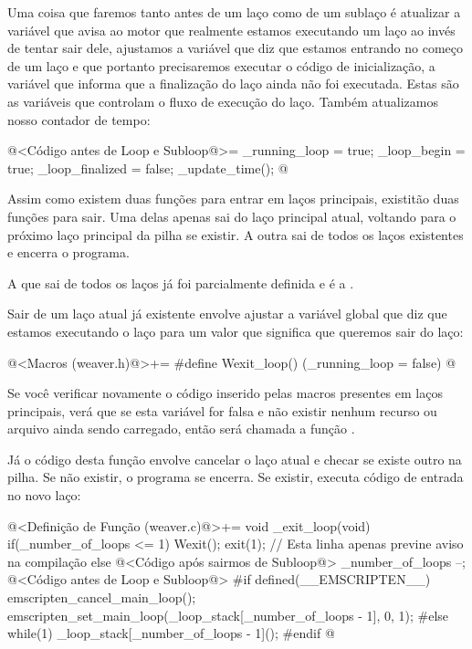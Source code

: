 Uma coisa que faremos tanto antes de um laço como de um sublaço é
atualizar a variável  que avisa ao motor
que realmente estamos executando um laço ao invés de tentar sair dele,
ajustamos a variável que diz que estamos entrando no começo de um laço
e que portanto precisaremos executar o código de inicialização, a
variável que informa que a finalização do laço ainda não foi
executada. Estas são as variáveis que controlam o fluxo de execução do
laço. Também atualizamos nosso contador de tempo:

\iniciocodigo
@<Código antes de Loop e Subloop@>=
_running_loop = true;
_loop_begin = true;
_loop_finalized = false;
_update_time();
@
\fimcodigo


Assim como existem duas funções para entrar em laços principais,
existitão duas funções para sair. Uma delas apenas sai do laço
principal atual, voltando para o próximo laço principal da pilha se
existir. A outra sai de todos os laços existentes e encerra o
programa.

A que sai de todos os laços já foi parcialmente definida e é
a .

Sair de um laço atual já existente envolve ajustar a variável global
que diz que estamos executando o laço para um valor que significa que
queremos sair do laço:

\iniciocodigo
@<Macros (weaver.h)@>+=
#define Wexit_loop() (_running_loop = false)
@
\fimcodigo

Se você verificar novamente o código inserido pelas macros presentes
em laços principais, verá que se esta variável for falsa e não existir
nenhum recurso ou arquivo ainda sendo carregado, então será chamada a
função .

Já o código desta função envolve cancelar o laço atual e checar se
existe outro na pilha. Se não existir, o programa se encerra. Se
existir, executa código de entrada no novo laço:

\iniciocodigo
@<Definição de Função (weaver.c)@>+=
void _exit_loop(void){
  if(_number_of_loops <= 1){
    Wexit();
    exit(1); // Esta linha apenas previne aviso na compilação
  }
  else{
    @<Código após sairmos de Subloop@>
    _number_of_loops --;
    @<Código antes de Loop e Subloop@>
#if defined(__EMSCRIPTEN__)
    emscripten_cancel_main_loop();
    emscripten_set_main_loop(_loop_stack[_number_of_loops - 1], 0, 1);
#else
    while(1)
      _loop_stack[_number_of_loops - 1]();
#endif
  }
}
@
\fimcodigo

